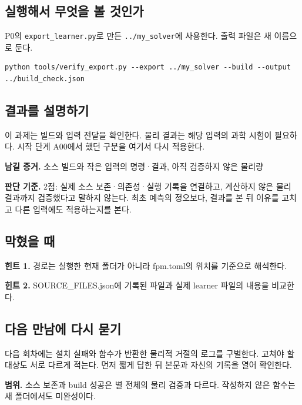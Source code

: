 \documentclass[
  10pt,
  a4paper,
]{article}
\begin{document}
\newpage

\subsection{실행해서 무엇을 볼
것인가}\label{uxc2e4uxd589uxd574uxc11c-uxbb34uxc5c7uxc744-uxbcfc-uxac83uxc778uxac00}

P0의 \texttt{export\_learner.py}로 만든 \texttt{../my\_solver}에
사용한다. 출력 파일은 새 이름으로 둔다.

\begin{verbatim}
python tools/verify_export.py --export ../my_solver --build --output ../build_check.json
\end{verbatim}

\subsection{결과를
설명하기}\label{uxacb0uxacfcuxb97c-uxc124uxba85uxd558uxae30}

이 과제는 빌드와 입력 전달을 확인한다. 물리 결과는 해당 입력의 과학
시험이 필요하다. 시작 단계 A00에서 했던 구분을 여기서 다시 적용한다.

\textbf{남길 증거.} 소스 빌드와 작은 입력의 명령·결과, 아직 검증하지
않은 물리량

\textbf{판단 기준.} 2점: 실제 소스 보존·의존성·실행 기록을 연결하고,
계산하지 않은 물리 결과까지 검증했다고 말하지 않는다. 최초 예측의
정오보다, 결과를 본 뒤 이유를 고치고 다른 입력에도 적용하는지를 본다.

\subsection{막혔을 때}\label{uxb9c9uxd614uxc744-uxb54c}

\textbf{힌트 1.} 경로는 실행한 현재 폴더가 아니라 fpm.toml의 위치를
기준으로 해석한다.

\textbf{힌트 2.} SOURCE\_FILES.json에 기록된 파일과 실제 learner 파일의
내용을 비교한다.

\subsection{다음 만남에 다시
묻기}\label{uxb2e4uxc74c-uxb9ccuxb0a8uxc5d0-uxb2e4uxc2dc-uxbb3buxae30}

다음 회차에는 설치 실패와 함수가 반환한 물리적 거절의 로그를 구별한다.
고쳐야 할 대상도 서로 다르게 적는다. 먼저 짧게 답한 뒤 본문과 자신의
기록을 열어 확인한다.

\textbf{범위.} 소스 보존과 build 성공은 별 전체의 물리 검증과 다르다.
작성하지 않은 함수는 새 폴더에서도 미완성이다.
\end{document}
